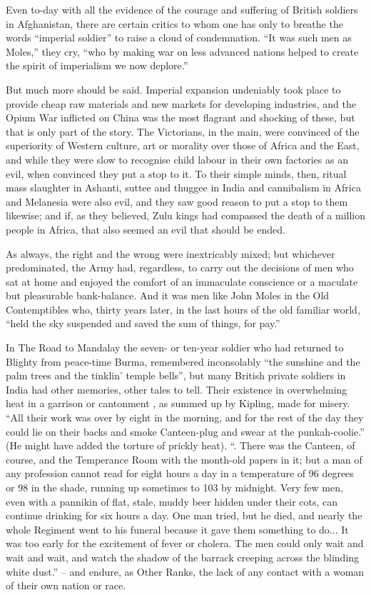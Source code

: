 Even to-day with all the evidence of the courage and suffering of British soldiers in Afghanistan, there are certain critics to whom one has only to breathe the words “imperial soldier” to raise a cloud of condemnation. “It was such men as Moles,” they cry, “who by making war on less advanced nations helped to create the spirit of imperialism we now deplore.” 

But much more should be said. Imperial expansion undeniably took place to provide cheap raw materials and new markets for developing industries, and the Opium War inflicted on China was the most flagrant and shocking of these, but that is only part of the story. The Victorians, in the main, were convinced of the superiority of Western culture, art or morality over those of Africa and the East, and while they were slow to recognise child labour in their own factories as an evil, when convinced they put a stop to it. To their simple minds, then, ritual mass slaughter in Ashanti, suttee and thuggee in India and cannibalism in Africa and Melanesia were also evil, and they saw good reason to put a stop to them likewise; and if, as they believed, Zulu kings had compassed the death of a million people in Africa, that also seemed an evil that should be ended.

As always, the right and the wrong were inextricably mixed; but whichever predominated, the Army had, regardless, to carry out the decisions of men who sat at home and enjoyed the comfort of an immaculate conscience or a maculate but pleasurable bank-balance. And it was men like John Moles in the Old Contemptibles who, thirty years later, in the last hours of the old familiar world, “held the sky suspended and saved the sum of things, for pay.”

In The Road to Mandalay the seven- or ten-year soldier who had returned to Blighty from peace-time Burma, remembered inconsolably “the sunshine and the palm trees and the tinklin’ temple bells”, but many British private soldiers in India had other memories, other tales to tell. Their existence in overwhelming heat in a garrison or cantonment , as summed up by Kipling, made for misery. “All their work was over by eight in the morning, and for the rest of the day they could lie on their backs and smoke Canteen-plug and swear at the punkah-coolie.” (He might have added the torture of prickly heat). “. There was the Canteen, of course, and the Temperance Room with the month-old papers in it; but a man of any profession cannot read for eight hours a day in a temperature of 96 degrees or 98 in the shade, running up sometimes to 103 by midnight. Very few men, even with a pannikin of flat, stale, muddy beer hidden under their cots, can continue drinking for six hours a day. One man tried, but he died, and nearly the whole Regiment went to his funeral because it gave them something to do... It was too early for the excitement of fever or cholera. The men could only wait and wait and wait, and watch the shadow of the barrack creeping across the blinding white dust.” – and endure, as Other Ranks, the lack of any contact with a woman of their own nation or race.

